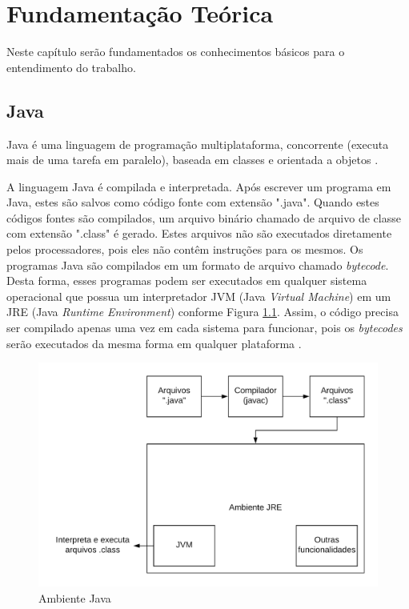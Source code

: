 \chapter{Fundamentação Teórica}
\label{ch:fundamentacao}
\par Neste capítulo ser\~ao fundamentados os conhecimentos b\'asicos para o entendimento do trabalho.

\section{Java}

\par Java é uma linguagem de programação multiplataforma, concorrente (executa mais de uma tarefa em paralelo), baseada em classes e orientada a objetos \cite{joy2000java}.
\par A linguagem Java é compilada e interpretada. Após escrever um programa em Java, estes são salvos como código fonte com extensão ".java". Quando estes códigos fontes são compilados, um arquivo binário chamado de arquivo de classe com extensão ".class" é gerado. Estes arquivos não são executados diretamente pelos processadores, pois eles não contêm instruções para os mesmos. Os programas Java são compilados em um formato de arquivo chamado \textit{bytecode}. Desta forma, esses programas podem ser executados em qualquer sistema operacional que possua um interpretador JVM (Java \textit{Virtual Machine}) em um JRE (Java \textit{Runtime} \textit{Environment}) conforme Figura \ref{fig:ambiente java}. Assim, o código precisa ser compilado apenas uma vez em cada sistema para funcionar, pois os \textit{bytecodes} serão executados da mesma forma em qualquer plataforma \cite{arnold2005java}.

\begin{figure}[H]
    \centering
    \includegraphics[scale=0.2]{src/imagens/cap1/ambiente-java.png}
    \caption{Ambiente Java}
    \label{fig:ambiente java}
\end{figure}

